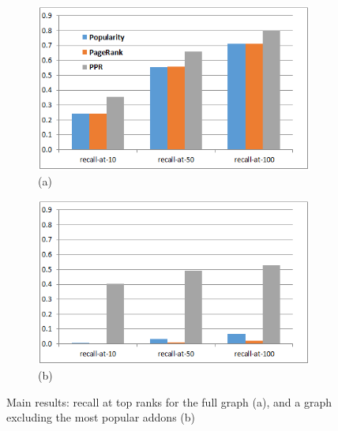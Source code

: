 \documentclass[ijoc,nonblindrev]{informs3} %
\numberwithin{equation}{subsection}
\begin{document}
\begin{figure}[!htbp]
\centering
\begin{subfigure}[b]{0.49\textwidth}
	\centering
	\includegraphics[width=\textwidth]{figures/pop-final.png}\\
	(a)
\end{subfigure}
\begin{subfigure}[b]{0.49\textwidth}
	\centering
	\includegraphics[width=\textwidth]{figures/sans-popular-final.png}\\
	(b)
\end{subfigure}
	\caption{Main results: recall at top ranks for the full graph (a), and a graph excluding the most popular addons (b)}
	\label{fig:main}
\end{figure}
\end{document}
